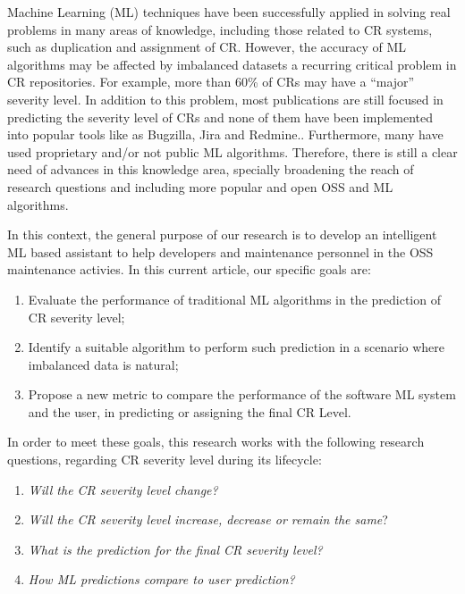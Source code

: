 \documentclass[10pt, conference]{IEEEtran}
\begin{document}
Machine Learning (ML) techniques have been successfully applied in solving real problems in many areas of knowledge, including those related to CR systems, such as duplication and assignment of CR\cite{Cavalcanti2014}. However, the accuracy of ML algorithms may be affected by imbalanced datasets \cite{Chawla2009} \textemdash  a recurring critical problem in CR repositories\cite{Tian2015}. For example, more than 60\% of CRs may have a ``major'' severity level. In addition to this problem, most publications are still focused in predicting the severity level of CRs and none of them have been implemented into popular tools like as Bugzilla, Jira and Redmine.\cite{Cavalcanti2014}. Furthermore, many have used proprietary and/or not public ML algorithms. Therefore, there is still a clear need of advances in this knowledge area, specially broadening the reach of research questions and including more popular and open OSS and ML algorithms.


In this context, the general purpose of our research is to develop an intelligent ML based assistant to help developers and maintenance personnel in the OSS maintenance activies. In this current article, our specific goals are:

\begin{enumerate}[$G_1:$]
\item Evaluate the performance of traditional ML algorithms in the prediction of CR severity level; 
\item Identify a suitable algorithm to perform such prediction in a scenario where imbalanced data is natural;
\item Propose a new metric to compare the performance of the software ML system and the user, in predicting or assigning the final CR Level.
\end{enumerate}

In order to meet these goals, this research works with the following research questions, regarding CR severity level during its lifecycle:

\begin{enumerate}[$RQ_1:$]
  \item \textit{Will the CR severity level change?}
  \item \textit{Will the CR severity level increase, decrease or remain the same}? 
  \item \textit{What is the prediction for the final CR severity level?}
  \item \textit{How ML predictions compare to user prediction?} 
\end{enumerate}
\end{document}
